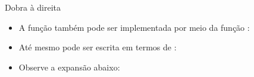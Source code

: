 \begin{frame}[fragile]{Dobra à direita}

    \begin{itemize}
        \item A função  também pode ser implementada por meio da função
            :


        \item Até mesmo  pode ser escrita em termos de :


        \item Observe a expansão abaixo:
    \end{itemize}

\end{frame}
